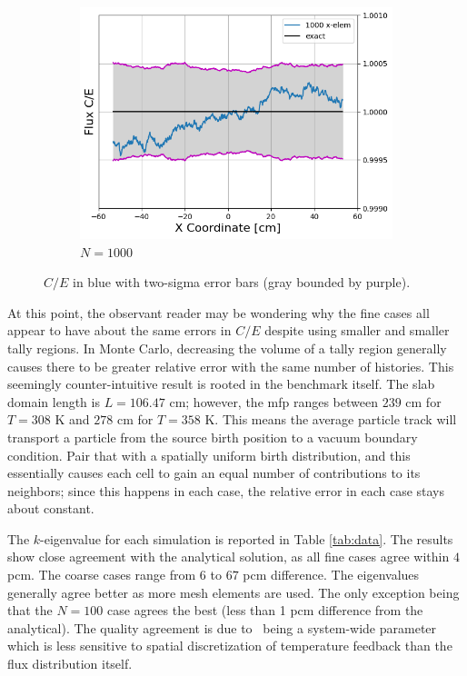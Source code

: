 \documentclass[letterpaper]{mc2023}
\begin{document}
\begin{figure}[H]
\begin{subfigure}{0.405\textwidth}
        \includegraphics[width=\linewidth]{figures/1000_flux_CE_error_bars}
        \caption{$N=1000$}
        \label{fig:s5}
    \end{subfigure}
    \par\medskip
    \caption{$C/E$ in blue with two-sigma error bars (gray bounded by purple).}
\label{fig:ce_error_bars}
\end{figure}

At this point, the observant reader may be wondering why the fine cases all appear to have about the same errors in $C/E$ despite using smaller and
smaller tally regions. In Monte Carlo, decreasing the volume of a tally region generally causes there to be greater relative error with the same number
of histories. This seemingly counter-intuitive result is rooted in the benchmark itself. The slab domain length is $L=106.47$ cm; however, the \gls{mfp}
ranges between $239$ cm for $T=308$ K and $278$ cm for $T=358$ K. This means the average particle track will transport a particle from the source birth
position to a vacuum boundary condition. Pair that with a spatially uniform birth distribution, and this essentially causes each cell to gain an equal
number of contributions to its neighbors; since this happens in each case, the relative error in each case stays about constant.

The $k$-eigenvalue for each simulation is reported in Table \ref{tab:data}. The results show close agreement with the analytical solution, as all
fine cases agree within $4$ pcm. The coarse cases range from $6$ to $67$ pcm difference. The eigenvalues generally agree better as more mesh elements
are used. The only exception being that the $N=100$ case agrees the best (less than 1 pcm difference from the analytical). The quality agreement is due to
\keff\ being a system-wide parameter which is less sensitive to spatial discretization of temperature feedback than the flux distribution itself.
\end{document}
